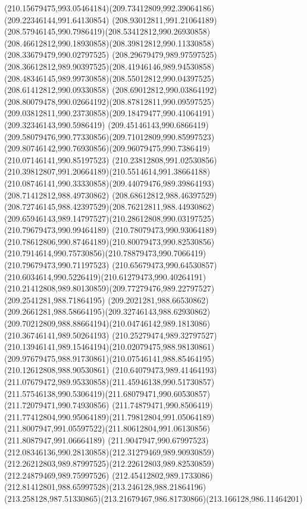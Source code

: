 {{		\curveto(210.15679475,993.05464184)(209.73412809,992.39064186)(209.22346144,991.64130854)
		\curveto(208.93012811,991.21064189)(208.57946145,990.7986419)(208.53412812,990.26930858)
		\curveto(208.46612812,990.18930858)(208.39812812,990.11330858)(208.33679479,990.02797525)
		\curveto(208.29679479,989.97597525)(208.36612812,989.90397525)(208.41946146,989.94530858)
		\curveto(208.48346145,989.99730858)(208.55012812,990.04397525)(208.61412812,990.09330858)
		\curveto(208.69012812,990.03864192)(208.80079478,990.02664192)(208.87812811,990.09597525)
		\curveto(209.03812811,990.23730858)(209.18479477,990.41064191)(209.32346143,990.5986419)
		\curveto(209.45146143,990.6866419)(209.58079476,990.77330856)(209.71012809,990.85997523)
		\curveto(209.80746142,990.76930856)(209.96079475,990.7386419)(210.07146141,990.85197523)
		\curveto(210.23812808,991.02530856)(210.39812807,991.20664189)(210.5514614,991.38664188)
		\curveto(210.08746141,990.33330858)(209.44079476,989.39864193)(208.71412812,988.49730862)
		\curveto(208.68612812,988.46397529)(208.72746145,988.42397529)(208.76212811,988.44930862)
		\curveto(209.65946143,989.14797527)(210.28612808,990.03197525)(210.79679473,990.99464189)
		\curveto(210.78079473,990.93064189)(210.78612806,990.87464189)(210.80079473,990.82530856)
		\curveto(210.7914614,990.75730856)(210.78879473,990.7066419)(210.79679473,990.71197523)
		\curveto(210.65679473,990.64530857)(210.6034614,990.5226419)(210.61279473,990.40264191)
		\curveto(210.21412808,989.80130859)(209.77279476,989.22797527)(209.2541281,988.71864195)
		\curveto(209.2021281,988.66530862)(209.2661281,988.58664195)(209.32746143,988.62930862)
		\curveto(209.70212809,988.88664194)(210.04746142,989.1813086)(210.36746141,989.50264193)
		\curveto(210.25279474,989.32797527)(210.13946141,989.15464194)(210.02079475,988.98130861)
		\curveto(209.97679475,988.91730861)(210.07546141,988.85464195)(210.12612808,988.90530861)
		\curveto(210.64079473,989.41464193)(211.07679472,989.95330858)(211.45946138,990.51730857)
		\curveto(211.57546138,990.5306419)(211.68079471,990.60530857)(211.72079471,990.74930856)
		\curveto(211.74879471,990.8506419)(211.77412804,990.95064189)(211.79812804,991.05064189)
		\curveto(211.8007947,991.05597522)(211.80612804,991.06130856)(211.8087947,991.06664189)
		\curveto(211.9047947,990.67997523)(212.08346136,990.28130858)(212.31279469,989.90930859)
		\curveto(212.26212803,989.87997525)(212.22612803,989.82530859)(212.24879469,989.75997526)
		\curveto(212.45412802,989.1733086)(212.81412801,988.65997528)(213.246128,988.21864196)
		\curveto(213.258128,987.51330865)(213.21679467,986.81730866)(213.166128,986.11464201)
}}
